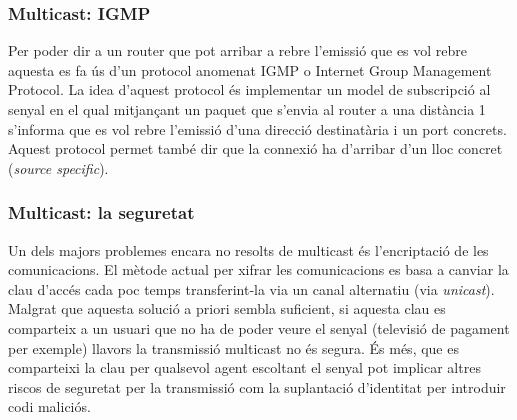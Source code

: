 \subsubsection{Multicast: IGMP}
{
    Per poder dir a un router que pot arribar a rebre l'emissió que es vol rebre aquesta es fa ús d'un protocol anomenat \ac{IGMP} o Internet Group
    Management Protocol. La idea d'aquest protocol és implementar un model de subscripció al senyal en el qual mitjançant un paquet que s'envia al
    router a una distància 1 s'informa que es vol rebre l'emissió d'una direcció destinatària i un port concrets. Aquest protocol permet també dir
    que la connexió ha d'arribar d'un lloc concret (\textit{source specific}).
}

\subsubsection{Multicast: la seguretat}
{
    Un dels majors problemes encara no resolts de multicast és l'encriptació de les comunicacions. El mètode actual per xifrar les comunicacions es
    basa a canviar la clau d'accés cada poc temps transferint-la via un canal alternatiu (via \textit{unicast}). Malgrat que aquesta solució a priori
    sembla suficient, si aquesta clau es comparteix a un usuari que no ha de poder veure el senyal (televisió de pagament per exemple) llavors la
    transmissió multicast no és segura. És més, que es comparteixi la clau per qualsevol agent escoltant el senyal pot implicar altres riscos de
    seguretat per la transmissió com la suplantació d'identitat per introduir codi maliciós.
}

